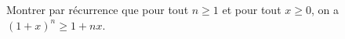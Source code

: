 

\begin{exercice}\label{exoSerieUn0018}

	Montrer par récurrence que pour tout $n\geq 1$ et pour tout $x\geq 0$, on a $(1+x)^n\geq 1+nx$.

\end{exercice}

